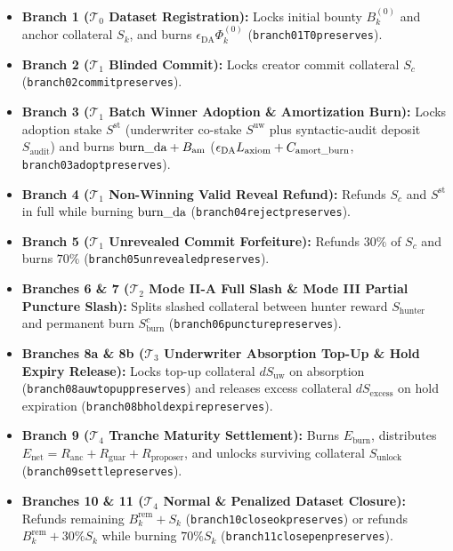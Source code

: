 \documentclass[runningheads,a4paper]{llncs}
\renewcommand{\_}{\textunderscore\allowbreak}
\begin{document}
\begin{itemize}
  \item \textbf{Branch 1 ($\mathcal{T}_0$ Dataset Registration):} Locks initial bounty $B_k^{(0)}$ and anchor collateral $S_k$, and burns $\epsilon_{\text{DA}} \Phi_k^{(0)}$ (\texttt{branch01\_T0\_preserves}).
  \item \textbf{Branch 2 ($\mathcal{T}_1$ Blinded Commit):} Locks creator commit collateral $S_c$ (\texttt{branch02\_commit\_preserves}).
  \item \textbf{Branch 3 ($\mathcal{T}_1$ Batch Winner Adoption \& Amortization Burn):} Locks adoption stake $S^{\text{st}}$ (underwriter co-stake $S^{\text{uw}}$ plus syntactic-audit deposit $S_{\text{audit}}$) and burns $\text{burn\_da} + B_{\text{am}}$ ($\epsilon_{\text{DA}} L_{\text{axiom}} + C_{\text{amort\_burn}}$, \texttt{branch03\_adopt\_preserves}).
  \item \textbf{Branch 4 ($\mathcal{T}_1$ Non-Winning Valid Reveal Refund):} Refunds $S_c$ and $S^{\text{st}}$ in full while burning $\text{burn\_da}$ (\texttt{branch04\_reject\_preserves}).
  \item \textbf{Branch 5 ($\mathcal{T}_1$ Unrevealed Commit Forfeiture):} Refunds $30\%$ of $S_c$ and burns $70\%$ (\texttt{branch05\_unrevealed\_preserves}).
  \item \textbf{Branches 6 \& 7 ($\mathcal{T}_2$ Mode II-A Full Slash \& Mode III Partial Puncture Slash):} Splits slashed collateral between hunter reward $S_{\text{hunter}}$ and permanent burn $S_{\text{burn}}^c$ (\texttt{branch06\_07\_puncture\_preserves}).
  \item \textbf{Branches 8a \& 8b ($\mathcal{T}_3$ Underwriter Absorption Top-Up \& Hold Expiry Release):} Locks top-up collateral $dS_{\text{uw}}$ on absorption (\texttt{branch08a\_uw\_topup\_preserves}) and releases excess collateral $dS_{\text{excess}}$ on hold expiration (\texttt{branch08b\_hold\_expire\_preserves}).
  \item \textbf{Branch 9 ($\mathcal{T}_4$ Tranche Maturity Settlement):} Burns $E_{\text{burn}}$, distributes $E_{\text{net}} = R_{\text{anc}} + R_{\text{guar}} + R_{\text{proposer}}$, and unlocks surviving collateral $S_{\text{unlock}}$ (\texttt{branch09\_settle\_preserves}).
  \item \textbf{Branches 10 \& 11 ($\mathcal{T}_4$ Normal \& Penalized Dataset Closure):} Refunds remaining $B_k^{\text{rem}} + S_k$ (\texttt{branch10\_close\_ok\_preserves}) or refunds $B_k^{\text{rem}} + 30\% S_k$ while burning $70\% S_k$ (\texttt{branch11\_close\_pen\_preserves}).

\end{itemize}
\end{document}
